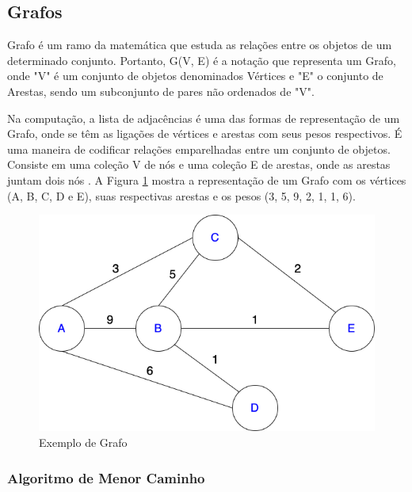 \subsection{Grafos}

\label{sec:grafos}
Grafo é um ramo da matemática que estuda as relações entre os objetos de um determinado conjunto. Portanto, G(V, E) é a notação que representa um Grafo, onde "V" é um conjunto de objetos denominados Vértices e "E" o conjunto de Arestas, sendo um subconjunto de pares não ordenados de "V".

Na computação, a lista de adjacências é uma das formas de representação de um Grafo, onde se têm as ligações de vértices e arestas com seus pesos respectivos. É uma maneira de codificar relações emparelhadas entre um conjunto de objetos. Consiste em uma coleção V de nós e uma coleção E de arestas, onde as arestas juntam dois nós \cite{Kleinberg+Tardos:06a}. A Figura \ref{grafo_1} mostra a representação de um Grafo com os vértices (A, B, C, D e E), suas respectivas arestas e os pesos (3, 5, 9, 2, 1, 1, 6).

\begin{figure}[H]
    \begin{center}
        \caption{Exemplo de Grafo}
        \label{grafo_1}
        \includegraphics[scale=0.5]{figuras/referencial_teorico/Grafo.drawio.png}
    \end{center}
\end{figure}

\subsubsection{Algoritmo de Menor Caminho}

